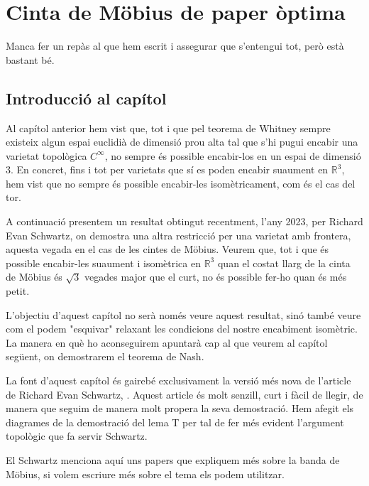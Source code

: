 \chapter{Cinta de Möbius de paper òptima}
{\color{red} Manca fer un repàs al que hem escrit i assegurar que s'entengui tot, però està bastant bé.
}
\section{Introducció al capítol}
Al capítol anterior hem vist que, tot i que pel teorema de Whitney sempre existeix algun espai euclidià de dimensió prou alta tal que s'hi pugui encabir una varietat topològica $C^\infty$, no sempre és possible encabir-los en un espai de dimensió 3. En concret, fins i tot per varietats que sí es poden encabir suaument en $\mathbb R^3$, hem vist que no sempre és possible encabir-les isomètricament, com és el cas del tor. 

A continuació presentem un resultat obtingut recentment, l'any 2023, per Richard Evan Schwartz, on demostra una altra restricció per una varietat amb frontera, aquesta vegada en el cas de les cintes de Möbius. Veurem que, tot i que és possible encabir-les suaument i isomètrica en $\mathbb R^3$ quan el costat llarg de la cinta de Möbius és $\sqrt3$ vegades major que el curt, no és possible fer-ho quan és més petit. 

L'objectiu d'aquest capítol no serà només veure aquest resultat, sinó també veure com el podem "esquivar" relaxant les condicions del nostre encabiment isomètric. La manera en què ho aconseguirem apuntarà cap al que veurem al capítol següent, on demostrarem el teorema de Nash. 

La font d'aquest capítol és gairebé exclusivament la versió més nova de l'article de Richard Evan Schwartz, \cite{schwartz2024}. Aquest article és molt senzill, curt i fàcil de llegir, de manera que seguim de manera molt propera la seva demostració. Hem afegit els diagrames de la demostració del lema T per tal de fer més evident l'argument topològic que fa servir Schwartz.

{\color{red} El Schwartz menciona aquí uns papers que expliquem més sobre la banda de Möbius, si volem escriure més sobre el tema els podem utilitzar.}

